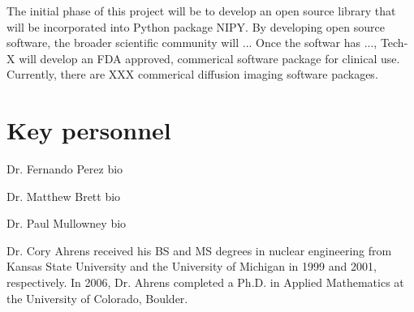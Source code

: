 \documentclass[10pt]{article}
\begin{document}
The initial phase of this project will be to develop an open source library that will be incorporated into Python package NIPY. By developing open source software, the broader scientific community will ... Once the softwar has ..., Tech-X will develop an FDA approved, commerical software package for clinical use. Currently, there are XXX commerical diffusion imaging software packages. 

\section*{Key personnel}

Dr. Fernando Perez bio

Dr. Matthew Brett bio

Dr. Paul Mullowney bio

Dr. Cory Ahrens received his BS and MS degrees in nuclear engineering from Kansas State University and the University of Michigan in 1999 and 2001, respectively. In 2006, Dr. Ahrens completed a Ph.D. in Applied Mathematics at the University of Colorado, Boulder.



 
\end{document}

